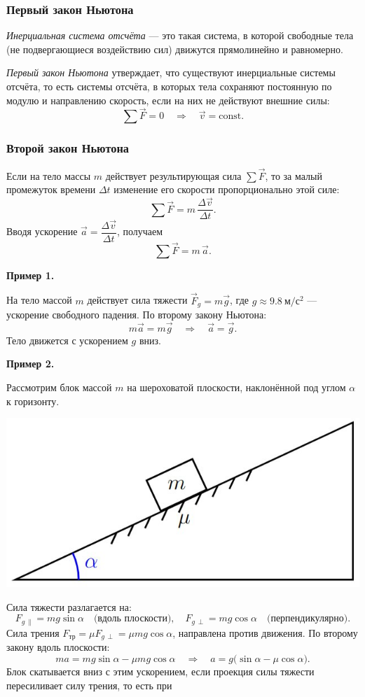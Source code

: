 \documentclass[12pt, a4paper]{article}%
\begin{document}
\subsubsection*{Первый закон Ньютона}
\textit{Инерциальная система отсчёта} — это такая система, в которой свободные тела (не подвергающиеся воздействию сил) движутся прямолинейно и равномерно. 


\textit{Первый закон Ньютона} утверждает, что существуют инерциальные системы отсчёта, то есть системы отсчёта, в которых тела сохраняют постоянную по модулю и направлению скорость, если на них не действуют внешние силы:
\[
\sum\vec F = 0 \quad\Longrightarrow\quad \vec v = \text{const}.
\]

\subsubsection*{Второй закон Ньютона}
Если на тело массы \(m\) действует результирующая сила \(\sum\vec F\), то за малый промежуток времени \(\Delta t\) изменение его скорости пропорционально этой силе:
\[
\sum\vec F = m\,\frac{\Delta\vec v}{\Delta t}.
\]
Вводя ускорение \(\vec a = \dfrac{\Delta\vec v}{\Delta t}\), получаем
\[
\sum\vec F = m\,\vec a.
\]

\textbf{Пример 1.}

На тело массой \(m\) действует сила тяжести \(\vec F_g = m\vec g\), 
где \(g\approx9.8\ \mathrm{м/с^2}\) — ускорение свободного падения. По второму закону Ньютона:
\[
m\vec a = m\vec g
\quad\Rightarrow\quad
\vec a = \vec g.
\]
Тело движется с ускорением \(g\) вниз.

\textbf{Пример 2.}

Рассмотрим блок массой \(m\) на шероховатой плоскости, наклонённой под углом \(\alpha\) к горизонту. 

\begin{center}
\includegraphics[width=0.43\linewidth]{9newton1.jpeg}
\label{fig:mpr}
\end{center}

Сила тяжести разлагается на:
\[
F_{g\,\parallel} = mg\sin\alpha
\quad\text{(вдоль плоскости)},\quad
F_{g\,\perp} = mg\cos\alpha
\quad\text{(перпендикулярно)}.
\]
Сила трения \(F_{\text{тр}}=\mu F_{g\,\perp}=\mu mg\cos\alpha\), направлена против движения. По второму закону вдоль плоскости:
\[
ma = mg\sin\alpha - \mu mg\cos\alpha
\quad\Rightarrow\quad
a = g\bigl(\sin\alpha - \mu\cos\alpha\bigr).
\]
Блок скатывается вниз с этим ускорением, если проекция силы тяжести пересиливает силу трения, то есть при
\end{document}
